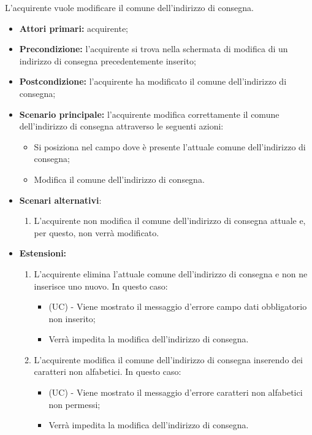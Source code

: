L'acquirente vuole modificare il comune dell'indirizzo di consegna.
\begin{itemize}
    \item \textbf{Attori primari:} acquirente;
    \item \textbf{Precondizione:} l'acquirente si trova nella schermata di modifica di un indirizzo di consegna precedentemente inserito;
    \item \textbf{Postcondizione:} l'acquirente ha modificato il comune dell'indirizzo di consegna;
    \item \textbf{Scenario principale:} l'acquirente modifica correttamente il comune dell'indirizzo di consegna attraverso le seguenti azioni:
    \begin{itemize}
        \item Si posiziona nel campo dove è presente l'attuale comune dell'indirizzo di consegna;
        \item Modifica il comune dell'indirizzo di consegna.
    \end{itemize}
    \item \textbf{Scenari alternativi}:
    \begin{enumerate}[label=\lett]
        \item L'acquirente non modifica il comune dell'indirizzo di consegna attuale e, per questo, non verrà modificato.
    \end{enumerate}
    \item \textbf{Estensioni:}
    \begin{enumerate}[label=\lett]
        \item L'acquirente elimina l'attuale comune dell'indirizzo di consegna e non ne inserisce uno nuovo. In questo caso:
        \begin{itemize}
            \item (UC) - Viene mostrato il messaggio d'errore campo dati obbligatorio non inserito;
            \item Verrà impedita la modifica dell'indirizzo di consegna.
        \end{itemize}
        \item L'acquirente modifica il comune dell'indirizzo di consegna inserendo dei caratteri non alfabetici. In questo caso:
        \begin{itemize}
            \item (UC) - Viene mostrato il messaggio d'errore caratteri non alfabetici non permessi;
            \item Verrà impedita la modifica dell'indirizzo di consegna.
        \end{itemize}
    \end{enumerate}
\end{itemize}

